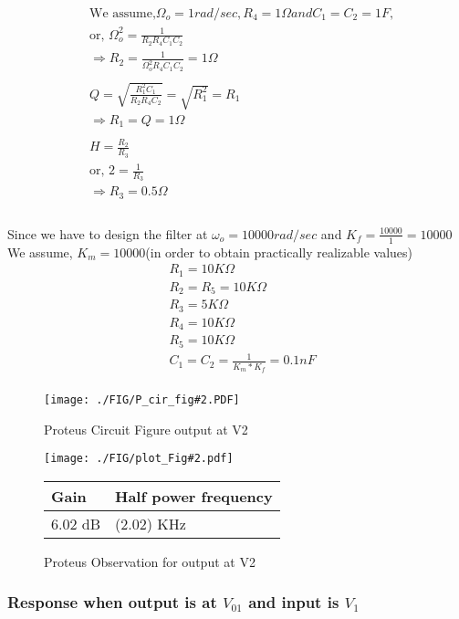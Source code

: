\documentclass[a4paper,11pt]{article}
\newcommand{\Porcirobs}[4]{
    \begin{figure}[H] %
        \centering
        \texttt{[image: ./FIG/P\_cir\_fig\#2.PDF]}
        \caption{Proteus Circuit Figure #2}
    \end{figure}



    \begin{figure}[H]  %
        \centering
        \texttt{[image: ./FIG/plot\_Fig\#2.pdf]}
        \begin{tabular}[H]{| m{12em}| m{20em}|}
            \hline
            \rowcolor[rgb]{0.569,0.647,0.947} \textbf{Gain } & \textbf{Half power frequency} \\ \hline
            #3 dB         & (#4) KHz     \\  \hline
        \end{tabular}
        \caption{Proteus Observation for #2}
    \end{figure}
}
\begin{document}
\begin{equation*}
    \begin{aligned}
         & \text{We assume,}\Omega_o = 1rad/sec, R_4 = 1\Omega and C_1= C_2= 1F, \\
         & \text{or, }\Omega_o^2= \frac{1}{R_2R_4C_1C_2}                         \\
         & \Rightarrow R_2= \frac{1}{\Omega_o^2R_4C_1C_2} = 1\Omega              \\\\
         & Q= \sqrt{\frac{R_1^2C_1}{R_2R_4C_2}}= \sqrt{R_1^2}= R_1               \\
         & \Rightarrow R_1 = Q = 1\Omega                                         \\\\
         & H= \frac{R_2}{R_3}                                                    \\
         & \text{or, } 2= \frac{1}{R_3}                                          \\
         & \Rightarrow R_3= 0.5\Omega                                            \\\\
    \end{aligned}
\end{equation*}

Since we have to design the filter at $\omega_o= 10000rad/sec$ and  $K_f= \frac{10000}{1}= 10000$\\

We assume, $K_m= 10000$(in order to obtain practically realizable values)\\
\begin{equation*}
    \begin{aligned}
         & R_1= 10K\Omega                     \\
         & R_2= R_5= 10K\Omega                \\
         & R_3= 5K\Omega                      \\
         & R_4= 10K\Omega                     \\
         & R_5= 10K\Omega                     \\
         & C_1= C_2= \frac{1}{K_m*K_f}= 0.1nF \\
    \end{aligned}
\end{equation*}

\Porcirobs{0.85}{output at V2}{6.02}{2.02}

\subsubsection*{Response when output is at $V_{01}$ and input is $V_{1}$}
\end{document}
